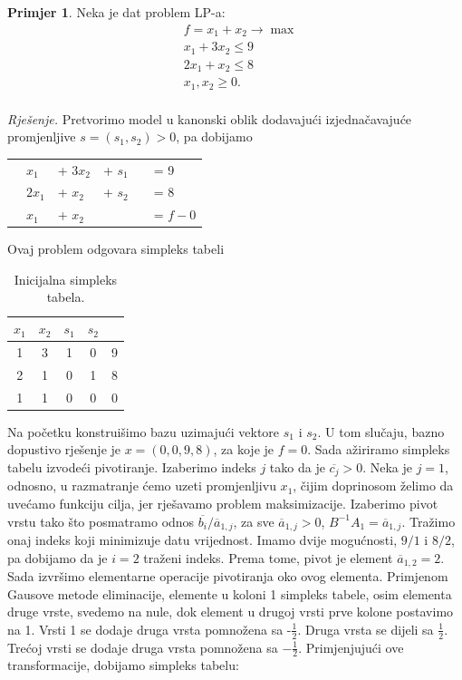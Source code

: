\documentclass[a4paper, utf8, 11pt, colorlinks]{book}
\theoremstyle{definition}
\newtheorem{primjer}{Primjer}[chapter]
\begin{document}
\begin{primjer}\label{primjer:simpl1} Neka je dat problem LP-a:
\begin{align*}
    &f= x_1 + x_2 \rightarrow \max \nonumber \\
    & x_1 + 3 x_2 \leq 9 \nonumber \\
    & 2x_1 + x_2 \leq 8  \nonumber \\
    & x_1, x_2 \geq 0. \nonumber \\
\end{align*}
 \end{primjer}
\emph{Rješenje.}
 Pretvorimo model u kanonski oblik dodavajući izjednačavajuće promjenljive $s = (s_1, s_2)>0$, pa dobijamo 
\begin{center}
\begin{tabular}{llllll}
	\centering
    & $x_1$    & + $3x_2$  &+ $s_1$ & &= 9 \\
    & $2 x_1$ &   + $x_2$  & + $s_2$ & &= 8 \\
    & $x_1$   &   + $x_2$  &\  & &= $f - 0$ \\
\end{tabular} 
\end{center}
  
 Ovaj problem odgovara simpleks tabeli \\
 \begin{table}[H]
     \centering
     \begin{tabular}{c c c c | c}
     	 $x_1$ & $x_2$ &  $s_1$ & $s_2$ & \\ \hline
         1 &  3  & 1 & 0 & 9 \\
         2 &  1  & 0 & 1 & 8 \\ \hline
         1 &  1  & 0  & 0 & 0 \\ \hline
     \end{tabular}
     \caption{Inicijalna simpleks tabela.}
     \label{tab:simpleks_tabela1}
 \end{table} 
 
 Na početku konstruišimo bazu uzimajući vektore $s_1$ i $s_2$. U tom slučaju, bazno dopustivo rješenje je $x = (0, 0, 9, 8)$, za koje je $f =0$. Sada ažiriramo simpleks tabelu izvodeći pivotiranje. Izaberimo indeks $j$ tako da je  $\overline{c_j}>0$. Neka je $j=1$, odnosno, u razmatranje ćemo uzeti promjenljivu $x_1$, čijim doprinosom želimo da uvećamo funkciju cilja, jer rješavamo problem maksimizacije. Izaberimo pivot vrstu tako što posmatramo odnos $\overline{b_i}/\overline{a}_{1,j}$, za sve $\overline{a}_{1,j} > 0$,  $B^{-1} A_1 = \overline{a}_{1,j}$. Tražimo onaj indeks koji minimizuje datu vrijednost. Imamo dvije mogućnosti, $9/1$ i $8/2$, pa dobijamo da je $i = 2$ traženi indeks. Prema tome, pivot je  element $\overline{a}_{1,2}=2$. Sada izvršimo elementarne operacije pivotiranja oko ovog elementa. Primjenom Gausove metode eliminacije, elemente u koloni 1 simpleks tabele, osim elementa druge vrste,  svedemo na nule, dok element u drugoj vrsti prve kolone postavimo na 1. Vrsti 1 se dodaje druga vrsta pomnožena sa -$\frac{1}{2}$. Druga vrsta se dijeli sa $\frac{1}{2}$. Trećoj vrsti se dodaje druga vrsta pomnožena sa $-\frac{1}{2}$. 
 Primjenjujući ove transformacije, dobijamo simpleks tabelu:
 
\end{document}
